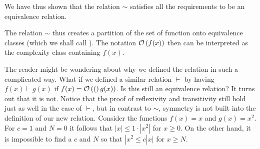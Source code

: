 We have thus shown that the relation $\sim$ satisfies all the requirements to
be an equivalence relation. 

The relation $\sim$ thus creates a partition of the set of function onto
equivalence classes (which we shall call ). The
notation
${\mathcal O}\/\left(f(x)\right)$ then can be interpreted as the complexity class containing $f(x)$.
\medskip

The reader might be wondering about why we defined the relation in such a
complicated way. What if we 
defined a similar relation $\vdash$ by having $f(x) \vdash g(x)$
if $f(x) = {\mathcal O}\/\left((\right)g(x))$. Is this still an equivalence relation?
It turns out that it is not. Notice that the proof of reflexivity
and transitivity still hold just as well in the case of $\vdash$, but
in contrast to $\sim$, symmetry is not built into the definition of our new
relation. Consider the functions $f(x) = x$ and $g(x)=x^2$. For $c=1$ and
$N=0$ it follows that $|x|\leq 1\cdot |x^2|$ for $x\geq0$. On the other
hand, it is impossible to find a $c$ and $N$ so that $|x^2\leq c|x|$ for
$x \geq N$. 




%




